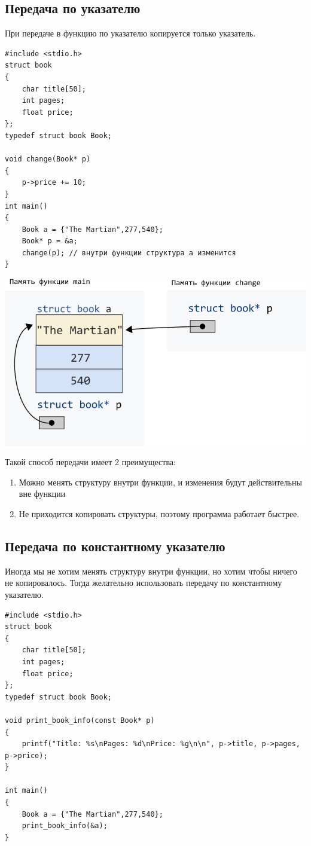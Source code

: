 \documentclass{article}
\begin{document}
\subsection*{Передача по указателю}
При передаче в функцию по указателю копируется только указатель.
\begin{multicols}{2}
\begin{lstlisting}
#include <stdio.h>
struct book 
{
    char title[50];
    int pages;
    float price;
};
typedef struct book Book;

void change(Book* p) 
{
    p->price += 10;
}
int main() 
{
    Book a = {"The Martian",277,540};
    Book* p = &a;
    change(p); // внутри функции структура a изменится
}
\end{lstlisting}
\vfill\null
\columnbreak
\begin{center}
\includegraphics[scale=0.5]{../images/structpassbypointer.png}
\end{center}
\end{multicols}

Такой способ передачи имеет 2 преимущества:
\begin{enumerate}
\item Можно менять структуру внутри функции, и изменения будут действительны вне функции
\item Не приходится копировать структуры, поэтому программа работает быстрее.
\end{enumerate}

\subsection*{Передача по константному указателю}
Иногда мы не хотим менять структуру внутри функции, но хотим чтобы ничего не копировалось. Тогда желательно использовать передачу по константному указателю.
\begin{lstlisting}
#include <stdio.h>
struct book 
{
    char title[50];
    int pages;
    float price;
};
typedef struct book Book;

void print_book_info(const Book* p) 
{
    printf("Title: %s\nPages: %d\nPrice: %g\n\n", p->title, p->pages, p->price);
}

int main() 
{
    Book a = {"The Martian",277,540};
    print_book_info(&a);
}
\end{lstlisting}
\newpage
\end{document}
